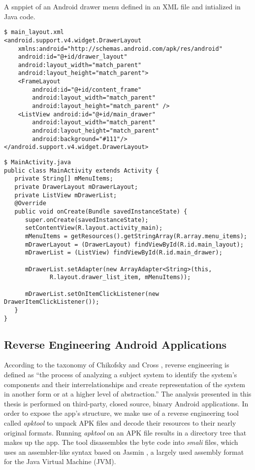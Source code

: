 \begin{listing}[!htb]
	\caption{A snppiet of an Android drawer menu defined in an XML file and intialized in Java code.}
	\begin{verbatim}
$ main_layout.xml
<android.support.v4.widget.DrawerLayout
    xmlns:android="http://schemas.android.com/apk/res/android"
    android:id="@+id/drawer_layout"
    android:layout_width="match_parent"
    android:layout_height="match_parent">
    <FrameLayout
        android:id="@+id/content_frame"
        android:layout_width="match_parent"
        android:layout_height="match_parent" />
    <ListView android:id="@+id/main_drawer"
        android:layout_width="match_parent"
        android:layout_height="match_parent"
        android:background="#111"/>
</android.support.v4.widget.DrawerLayout>
\end{verbatim}
\begin{verbatim}
$ MainActivity.java
public class MainActivity extends Activity {
   private String[] mMenuItems;
   private DrawerLayout mDrawerLayout;
   private ListView mDrawerList;
   @Override
   public void onCreate(Bundle savedInstanceState) {
      super.onCreate(savedInstanceState);
      setContentView(R.layout.activity_main);
      mMenuItems = getResources().getStringArray(R.array.menu_items);    
      mDrawerLayout = (DrawerLayout) findViewById(R.id.main_layout);
      mDrawerList = (ListView) findViewById(R.id.main_drawer);
				
      mDrawerList.setAdapter(new ArrayAdapter<String>(this,
             R.layout.drawer_list_item, mMenuItems));
				
      mDrawerList.setOnItemClickListener(new DrawerItemClickListener());
   }
}
\end{verbatim}
	\label{lst:ui_example}
\end{listing}

\subsection{Reverse Engineering Android Applications}
According to the taxonomy of Chikofsky and Cross \cite{chikofsky_1990_reverse}, reverse engineering is defined as ``the process of analyzing a subject system to identify the system's components and their interrelationships and create representation of the system in another form or at a higher level of abstraction.''
The analysis presented in this thesis is performed on third-party, closed source, binary Android applications.
In order to expose the app’s structure, we make use of a reverse engineering tool called \textit{apktool} \cite{apktool} to unpack APK files and decode their resources to their nearly original formats.
Running \textit{apktool} on an APK file results in a directory tree that makes up the app.
The tool disassembles the byte code into \textit{smali} files, which uses an assembler-like syntax based on Jasmin \cite{jasmin_assembler}, a largely used assembly format for the Java Virtual Machine (JVM).

